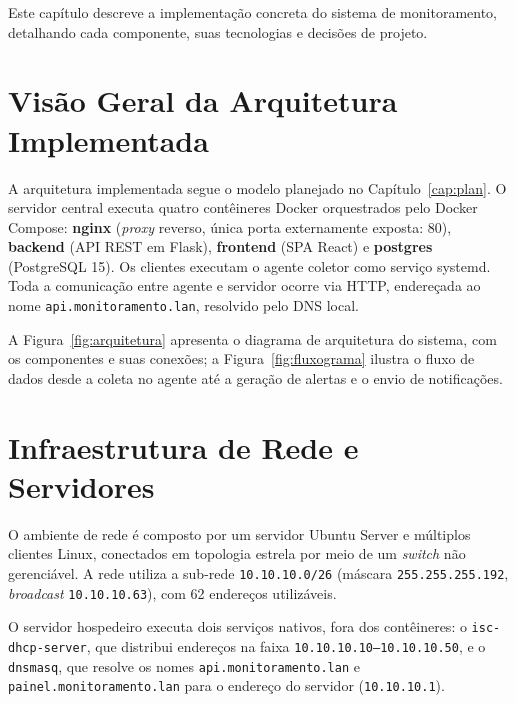 \documentclass[
    12pt
    ,oneside
    ,a4paper
    ,chapter=TITLE
    ,section=TITLE
    ,sumario=abnt-6027-2012]{abntex2}
\begin{document}
Este capítulo descreve a implementação concreta do sistema de monitoramento, detalhando
cada componente, suas tecnologias e decisões de projeto.

\section{Visão Geral da Arquitetura Implementada}
\label{sec:arq-impl}

A arquitetura implementada segue o modelo planejado no Capítulo~\ref{cap:plan}. O
servidor central executa quatro contêineres Docker orquestrados pelo Docker Compose:
\textbf{nginx} (\textit{proxy} reverso, única porta externamente exposta: 80),
\textbf{backend} (API REST em Flask), \textbf{frontend} (SPA React) e
\textbf{postgres} (PostgreSQL 15). Os clientes executam o agente coletor como
serviço systemd. Toda a comunicação entre agente e servidor ocorre via HTTP,
endereçada ao nome \texttt{api.monitoramento.lan}, resolvido pelo DNS local.

A Figura~\ref{fig:arquitetura} apresenta o diagrama de arquitetura do sistema, com os
componentes e suas conexões; a Figura~\ref{fig:fluxograma} ilustra o fluxo de dados desde
a coleta no agente até a geração de alertas e o envio de notificações.

\begin{figure}[H]
\end{figure}

\begin{figure}[H]
\end{figure}

\section{Infraestrutura de Rede e Servidores}
\label{sec:infra}

O ambiente de rede é composto por um servidor Ubuntu Server e múltiplos clientes
Linux, conectados em topologia estrela por meio de um \textit{switch} não gerenciável.
A rede utiliza a sub-rede \texttt{10.10.10.0/26} (máscara \texttt{255.255.255.192},
\textit{broadcast} \texttt{10.10.10.63}), com 62 endereços utilizáveis.

O servidor hospedeiro executa dois serviços nativos, fora dos contêineres: o
\texttt{isc-dhcp-server}, que distribui endereços na faixa
\texttt{10.10.10.10--10.10.10.50}, e o \texttt{dnsmasq}, que resolve os nomes
\texttt{api.monitoramento.lan} e \texttt{painel.monitoramento.lan} para o endereço
do servidor (\texttt{10.10.10.1}).
\end{document}
